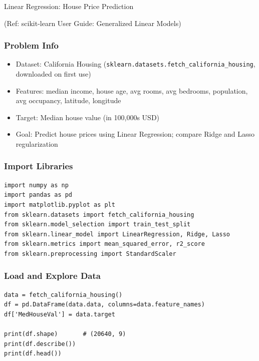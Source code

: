 \begin{frame}[fragile]\frametitle{}
\begin{center}
{\Large Linear Regression: House Price Prediction}

{\tiny (Ref: scikit-learn User Guide: Generalized Linear Models)}
\end{center}
\end{frame}

\begin{frame}[fragile]\frametitle{Problem Info}
\begin{itemize}
\item Dataset: California Housing (\texttt{sklearn.\allowbreak datasets.\allowbreak fetch\_california\_housing}, downloaded on first use)
\item Features: median income, house age, avg rooms, avg bedrooms, population, avg occupancy, latitude, longitude
\item Target: Median house value (in 100,000s USD)
\item Goal: Predict house prices using Linear Regression; compare Ridge and Lasso regularization
\end{itemize}
\end{frame}

\begin{frame}[fragile]\frametitle{Import Libraries}
\begin{lstlisting}
import numpy as np
import pandas as pd
import matplotlib.pyplot as plt
from sklearn.datasets import fetch_california_housing
from sklearn.model_selection import train_test_split
from sklearn.linear_model import LinearRegression, Ridge, Lasso
from sklearn.metrics import mean_squared_error, r2_score
from sklearn.preprocessing import StandardScaler
\end{lstlisting}
\end{frame}

\begin{frame}[fragile]\frametitle{Load and Explore Data}
\begin{lstlisting}
data = fetch_california_housing()
df = pd.DataFrame(data.data, columns=data.feature_names)
df['MedHouseVal'] = data.target

print(df.shape)       # (20640, 9)
print(df.describe())
print(df.head())
\end{lstlisting}
\end{frame}

